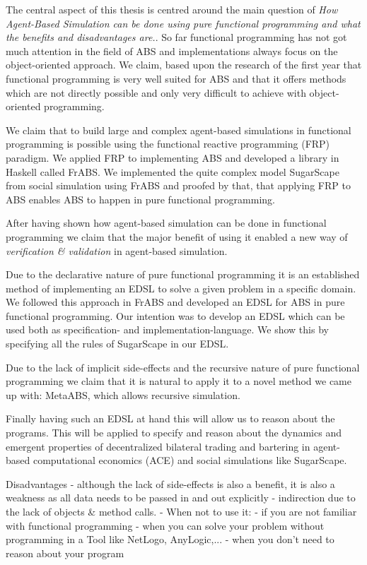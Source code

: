 The central aspect of this thesis is centred around the main question of \textit{How Agent-Based Simulation can be done using pure functional programming and what the benefits and disadvantages are.}. So far functional programming has not got much attention in the field of ABS and implementations always focus on the object-oriented approach. We claim, based upon the research of the first year that functional programming is very well suited for ABS and that it offers methods which are not directly possible and only very difficult to achieve with object-oriented programming.

We claim that to build large and complex agent-based simulations in functional programming is possible using the functional reactive programming (FRP) paradigm. We applied FRP to implementing ABS and developed a library in Haskell called FrABS. We implemented the quite complex model SugarScape from social simulation using FrABS and proofed by that, that applying FRP to ABS enables ABS to happen in pure functional programming.

After having shown how agent-based simulation can be done in functional programming we claim that the major benefit of using it enabled a new way of \textit{verification \& validation} in agent-based simulation. 

Due to the declarative nature of pure functional programming it is an established method of implementing an EDSL to solve a given problem in a specific domain. We followed this approach in FrABS and developed an EDSL for ABS in pure functional programming. Our intention was to develop an EDSL which can be used both as specification- and implementation-language. We show this by specifying all the rules of SugarScape in our EDSL.

Due to the lack of implicit side-effects and the recursive nature of pure functional programming we claim that it is natural to apply it to a novel method we came up with: MetaABS, which allows recursive simulation.

Finally having such an EDSL at hand this will allow us to reason about the programs. This will be applied to specify and reason about the dynamics and emergent properties of decentralized bilateral trading and bartering in agent-based computational economics (ACE) and social simulations like SugarScape.

Disadvantages
- although the lack of side-effects is also a benefit, it is also a weakness as all data needs to be passed in and out explicitly 
- indirection due to the lack of objects \& method calls.
- When not to use it: 
	- if you are not familiar with functional programming
	- when you can solve your problem without programming in a Tool like NetLogo, AnyLogic,...
	- when you don't need to reason about your program
	
